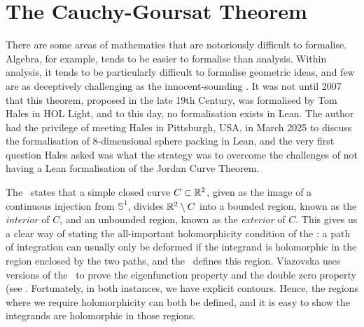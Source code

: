 \section{The Cauchy-Goursat Theorem}
\label{Ch5:Sec:Cauchy-Goursat}

\begin{comment}
Maybe begin with an anecdote - no sooner had we entered Hales's office in Pittsburgh than he asked about how we plan to deform integration contours.

Have 3 subsections.
1. Informal maths
2. Discussion of existing formalisation of closed rectangular case, with emphasis on why we don't have it for other cases (cite Hales's formalisation of the Jordan Curve Theorem in HOL-Light, maybe try and explain why we don't have something similar in Lean)
3. Discussion of our approach to the indefinite case (informally and formally)
Also maybe find better words than closed/open? Because these words are NOT used here in a topological sense, but rather in a very visual sense ("are the two endpoints of the curve the same point or are they not? Does the curve even have two endpoints or does it just have one and then go off to i\infty in the other?")
\end{comment}

There are some areas of mathematics that are notoriously difficult to formalise. Algebra, for example, tends to be easier to formalise than analysis. Within analysis, it tends to be particularly difficult to formalise geometric ideas, and few are as deceptively challenging as the innocent-sounding \JCT. It was not until 2007 that this theorem, proposed in the late 19th Century, was formalised by Tom Hales \cite{JordanCurve} in HOL Light, and to this day, no formalisation exists in Lean. The author had the privilege of meeting Hales in Pittsburgh, USA, in March 2025 to discuss the formalisation of $8$-dimensional sphere packing in Lean, and the very first question Hales asked was what the strategy was to overcome the challenges of not having a Lean formalisation of the Jordan Curve Theorem.

The \JCT\ states that a simple closed curve $C \subset \mathbb{R}^2$, given as the image of a continuous injection from $\mathbb{S}^1$, divides $\mathbb{R}^2 \setminus C$ into a bounded region, known as the \textit{interior} of $C$, and an unbounded region, known as the \textit{exterior} of $C$. This gives us a clear way of stating the all-important holomorphicity condition of the \CGT: a path of integration can usually only be deformed if the integrand is holomorphic in the region enclosed by the two paths, and the \JCT\ defines this region. Viazovska uses versions of the \CGT\ to prove the eigenfunction property and the double zero property (see . Fortunately, in both instances, we have explicit contours. Hence, the regions where we require holomorphicity can both be defined, and it is easy to show the integrands are holomorphic in those regions.

